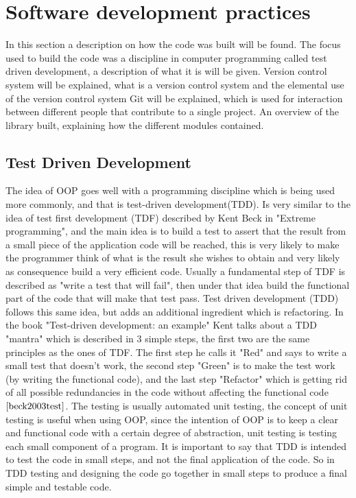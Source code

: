 \documentclass{book}
\begin{document}
\newpage
\section{Software development practices}
\maketitle

In this section a description on how the code was built will be found. The focus used to build the code was a discipline in computer programming called test driven development, a description of what it is will be given. Version control system will be explained, what is a version control system and the elemental use of the version control system Git will be explained, which is used for interaction between different people that contribute to a single project. An overview of the library built, explaining how the different modules contained.




\subsection{Test Driven Development}
The idea of OOP goes well with a programming discipline which is being used more commonly, and that is test-driven development(TDD). Is very similar to the idea of test first development (TDF) described by Kent Beck in "Extreme programming", and the main idea is to build a test to assert that the result from a small piece of the application code will be reached, this is very likely to make the programmer think of what is the result she wishes to obtain and very likely as consequence build a very efficient code. Usually a fundamental  step of TDF is described as "write a test that will fail", then under that idea build the functional part of the code that will make that test pass. Test driven development (TDD) follows this same idea, but adds an additional ingredient which is refactoring. In the book "Test-driven development: an example" Kent talks about a TDD "mantra" which is described in 3 simple steps, the first two are the same principles as the ones of TDF. The first step he calls it "Red" and says to write a small test that doesn't work, the second step "Green" is to make the test work (by writing the functional code), and the last step "Refactor" which is getting rid of all possible redundancies in the code without affecting the functional code $\cite{beck2003test}$. The testing is usually automated unit testing, the concept of unit testing is useful when using OOP, since the intention of OOP is to keep a clear and functional code with a certain degree of abstraction, unit testing is testing each small component of a program. It is important to say that TDD is intended to test the code in small steps, and not the final application of the code. So in TDD testing and designing the code go together in small steps to produce a final simple and testable code. 
\end{document}
